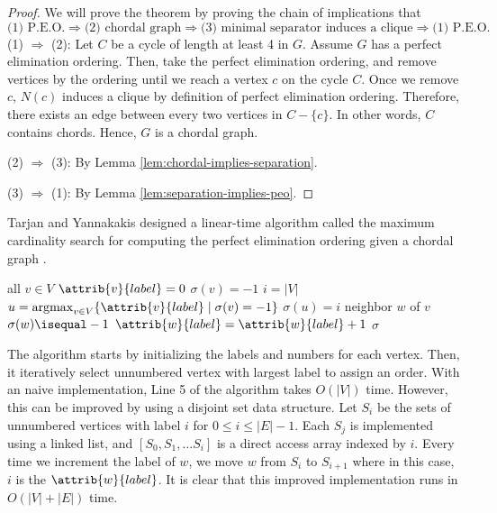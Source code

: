 \begin{proof}
    We will prove the theorem by proving the chain of implications that
    $$
    \text{(1) P.E.O.} \Rightarrow \text{(2) chordal graph}\Rightarrow \text{(3) minimal separator induces a clique} \Rightarrow \text{(1) P.E.O.}
    $$
    (1) $\Rightarrow$ (2): Let $C$ be a cycle of length at least 4 in $G$. Assume $G$ has a perfect elimination ordering. Then, take the perfect elimination ordering, and remove vertices by the ordering until we reach a vertex $c$ on the cycle $C$. Once we remove $c$, $N(c)$ induces a clique by definition of perfect elimination ordering. Therefore, there exists an edge between every two vertices in $C-\{c\}$. In other words, $C$ contains chords. Hence, $G$ is a chordal graph.

    (2) $\Rightarrow$ (3): By Lemma \ref{lem:chordal-implies-separation}.

    (3) $\Rightarrow$ (1): By Lemma \ref{lem:separation-implies-peo}.
\end{proof}

Tarjan and Yannakakis designed a linear-time algorithm called the maximum cardinality search for computing the perfect elimination ordering given a chordal graph \cite{Tarjan-Chordal-Graph}.

\begin{codebox}
    \li \For all $v \in V$ \Do
        \li $\attrib{v}{label} = 0$
        \li $\sigma(v) = -1$ 
    \End
    \li \For $i=|V|$  \Do
        \li $u = \mathrm{argmax}_{v \in V} \{ \attrib{v}{label} \mid \sigma(v) = -1 \}$ \quad {}
        \li $\sigma(u) = i$ \quad {}
        \li \For neighbor $w$ of $v$ \Do
            \li \If $\sigma(w) \isequal -1$ \Then
                \li $\attrib{w}{label} = \attrib{w}{label} + 1$
            \End
        \End
    \End
    \li \Return $\sigma$
\end{codebox}

The algorithm starts by initializing the labels and numbers for each vertex. Then, it iteratively select unnumbered vertex with largest label to assign an order. With an naive implementation, Line 5 of the algorithm takes $O(|V|)$ time. However, this can be improved by using a disjoint set data structure. Let $S_i$ be the sets of unnumbered vertices with label $i$ for $0 \leq i \leq |E|-1$. Each $S_j$ is implemented using a linked list, and $[S_0,S_1,\ldots S_{i} ]$ is a direct access array indexed by $i$. Every time we increment the label of $w$, we move $w$ from $S_{i}$ to $S_{i+1}$ where in this case, $i$ is the $\attrib{w}{label}$. It is clear that this improved implementation runs in $O(|V|+|E|)$ time.

